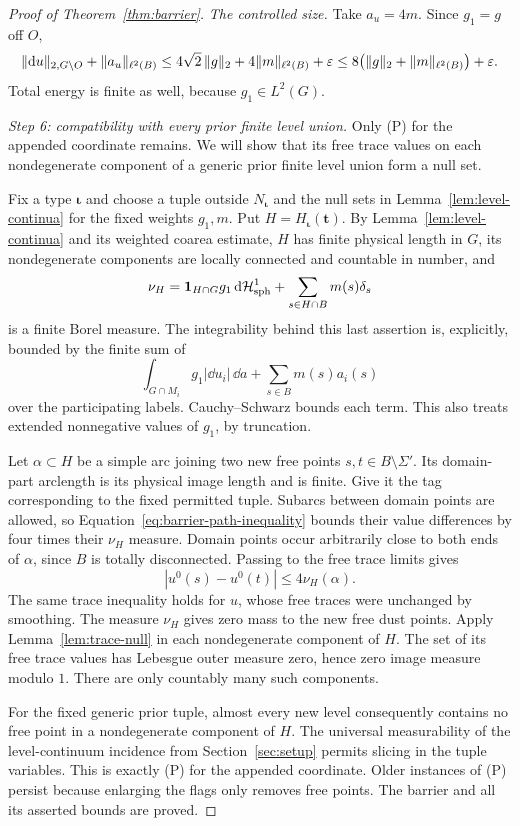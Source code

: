 \begin{proof}[Proof of Theorem~\ref{thm:barrier}]
\emph{The controlled size.}
Take $a_u=4m$.  Since $g_1=g$ off $O$,
\[
 \|\mathrm d u\|_{2,G\setminus O}+\|a_u\|_{\ell^2(B)}
 \le4\sqrt2\,\|g\|_2+4\|m\|_{\ell^2(B)}+\varepsilon
 \le8\bigl(\|g\|_2+\|m\|_{\ell^2(B)}\bigr)+\varepsilon.
\]
Total energy is finite as well, because $g_1\in L^2(G)$.

\emph{Step 6: compatibility with every prior finite level union.}
Only \textup{(P)} for the appended coordinate remains.  We will show
that its free trace values on each nondegenerate component of a generic
prior finite level union form a null set.

Fix a type $\boldsymbol\iota$ and choose a tuple outside
$N_{\boldsymbol\iota}$ and the null sets in
Lemma~\ref{lem:level-continua} for the fixed weights $g_1,m$.  Put
$H=H_{\boldsymbol\iota}(\mathbf t)$.  By
Lemma~\ref{lem:level-continua} and its weighted coarea estimate,
$H$ has finite physical length in $G$, its nondegenerate components
are locally connected and countable in number, and
\begin{equation}\label{eq:barrier-level-measure}
 \nu_H
   =\mathbf 1_{H\cap G}g_1\,\mathrm d\mathcal H^1_{\mathrm{sph}}
          +\sum_{s\in H\cap B}m(s)\delta_s
\end{equation}
is a finite Borel measure.  The integrability behind this last
assertion is, explicitly, bounded by the finite sum of
\[
 \int_{G\cap M_i}g_1|\dd u_i|\,\dd a
       +\sum_{s\in B}m(s)a_i(s)
\]
over the participating labels.  Cauchy--Schwarz bounds each term.
This also treats extended nonnegative values of $g_1$, by truncation.

Let $\alpha\subset H$ be a simple arc joining two new free points
$s,t\in B\setminus\Sigma'$.  Its domain-part arclength is its
physical image length and is finite.  Give it the tag corresponding
to the fixed permitted tuple.  Subarcs between domain points are
allowed, so Equation~\eqref{eq:barrier-path-inequality} bounds their
value differences by four times their $\nu_H$ measure.  Domain
points occur arbitrarily close to both ends of $\alpha$, since $B$
is totally disconnected.  Passing to the free trace limits gives
\[
 |u^0(s)-u^0(t)|\le4\nu_H(\alpha).
\]
The same trace inequality holds for $u$, whose free traces were
unchanged by smoothing.  The measure $\nu_H$ gives zero mass to
the new free dust points.  Apply Lemma~\ref{lem:trace-null} in
each nondegenerate component of $H$.  The set of its free trace
values has Lebesgue outer measure zero, hence zero image measure
modulo $1$.  There are only countably many such components.

For the fixed generic prior tuple, almost every new level consequently
contains no free point in a nondegenerate component of $H$.
The universal measurability of the level-continuum incidence from
Section~\ref{sec:setup} permits slicing in the tuple variables.
This is exactly \textup{(P)} for the appended coordinate.  Older
instances of \textup{(P)} persist because enlarging the flags only
removes free points.  The barrier and all its asserted bounds are
proved.
\end{proof}

